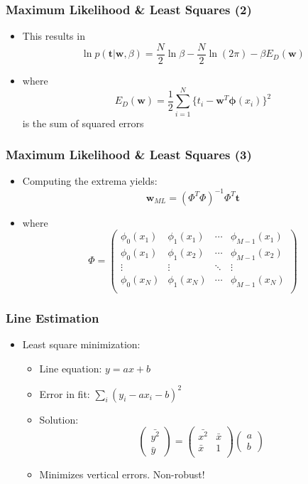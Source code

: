 \documentclass[10pt]{beamer}
\begin{document}
\begin{frame}
  \frametitle{Maximum Likelihood \& Least Squares (2)}
  \begin{itemize}
  \item This results in 
    \[
    \ln p({\mathbf t}|{\mathbf w}, \beta ) = \frac{N}{2} \ln \beta -
    \frac{N}{2} \ln (2\pi) - \beta E_D({\mathbf w})
    \]
  \item where
    \[
    E_D({\mathbf w}) = \frac{1}{2} \sum_{i=1}^{N} \{ t_i - {\mathbf
      w}^T{\mathbf \phi}(x_i)\}^2
    \]
    is the sum of squared errors
  \end{itemize}
\end{frame}

\begin{frame}
  \frametitle{Maximum Likelihood \& Least Squares (3)}
  \begin{itemize}
  \item Computing the extrema yields:
    \[
    {\mathbf w}_{ML} = \left( \Phi^T \Phi \right)^{-1} \Phi^T
    {\mathbf t}
    \]
  \item where
    \[
    \Phi = \left(
      \begin{array}{cccc}
        \phi_0(x_1) & \phi_1(x_1) & \cdots & \phi_{M-1}(x_1) \\
        \phi_0(x_1) & \phi_1(x_2) & \cdots & \phi_{M-1}(x_2) \\
        \vdots      & \vdots      & \ddots & \vdots         \\
        \phi_0(x_N) & \phi_1(x_N) & \cdots & \phi_{M-1}(x_N) \\
      \end{array}
    \right)
    \]
  \end{itemize}
\end{frame}

\begin{frame}
  \frametitle{Line Estimation}
  \begin{itemize}
  \item Least square minimization:
    \begin{itemize}\setlength{\itemsep}{0pt}
    \item Line equation: $y=a x + b$
    \item Error in fit: $\sum_i (y_i - a x_i - b)^2$
    \item Solution: \[ 
      \left( \begin{array}{c} \bar{y^2}\\ \bar{y} \end{array}
      \right) = \left( \begin{array}{cc} 
          \bar{x^2} & \bar{x} \\
          \bar{x}   & 1\\ \end{array} \right) \left( 
        \begin{array}{c} a \\ b \end{array} \right)
      \]
    \item Minimizes vertical errors. Non-robust!
    \end{itemize}
  \end{itemize}  
\end{frame}
\end{document}

